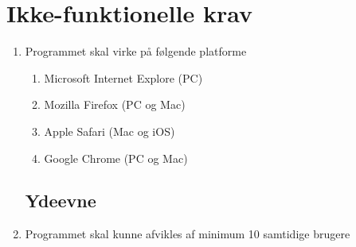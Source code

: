 \section{Ikke-funktionelle krav}
\begin{enumerate}
	\subsection*{Brugbarhed}
	\item Programmet skal virke på følgende platforme
	\begin{enumerate}
		\item Microsoft Internet Explore (PC)
		\item Mozilla Firefox (PC og Mac)
		\item Apple Safari (Mac og iOS)
		\item Google Chrome (PC og Mac)
	\end{enumerate}
	
	\subsection*{Ydeevne}
	\item Programmet skal kunne afvikles af minimum 10 samtidige brugere
\end{enumerate}